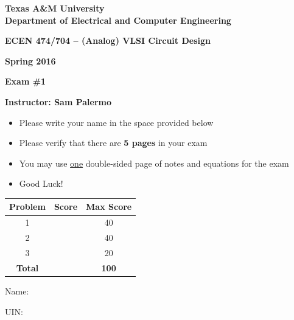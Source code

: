 \vspace*{1.15in}
\begin{center}
{\sffamily\bfseries\Large Texas A\&M University\\
Department of Electrical and Computer Engineering\par}
\vspace{.35in}
{\sffamily\bfseries\large ECEN 474/704 -- (Analog) VLSI Circuit Design\par}
\vspace{.35in}
{\sffamily\bfseries\large Spring 2016\par}
\vspace{.28in}
{\sffamily\bfseries\large Exam \#1\par}
\vspace{.28in}
{\sffamily\bfseries\large Instructor: Sam Palermo\par}
\end{center}
\vspace{.35in}
\begin{itemize}[leftmargin=24pt,itemsep=1pt,topsep=0pt]
\item Please write your name in the space provided below
\item Please verify that there are \textbf{5 pages} in your exam
\item You may use \underline{one} double-sided page of notes and equations for the exam
\item Good Luck!
\end{itemize}
\vspace{.65in}
\begin{tabular}{|c|c|c|}\hline
Problem & Score & Max Score\\\hline
1&&40\\\hline
2&&40\\\hline
3&&20\\\hline
\textbf{Total}&&\textbf{100}\\\hline
\end{tabular}
\vfill
Name: \hrulefill\par
\vspace{8pt}
UIN: \hrulefill
\newpage

